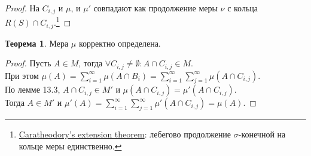 \documentclass[11pt,a4paper]{report}
\theoremstyle{definition}
\theoremstyle{definition}
\newtheorem{theorem}{Теорема}[section]
\theoremstyle{definition}
\begin{document}
	\begin{proof}
		На $ C_{i, j} $ и $ \mu $, и $ \mu' $ совпадают как продолжение меры $ \nu $ с кольца $ R(S) \cap C_{i, j} $.\footnote{\href{https://goo.gl/DLPJQ1}{Caratheodory's extension theorem}: лебегово продолжение $ \sigma $-конечной на кольце меры единственно.}
	\end{proof}
	\begin{theorem}
		Мера $ \mu $ корректно определена.
	\end{theorem}
	\begin{proof}
		Пусть $ A \in M $, тогда $ \forall C_{i, j} \neq \emptyset: A \cap C_{i, j} \in M $.\\ 
		При этом
		$ \mu(A) = \sum\limits_{i=1}^{\infty}{\mu(A \cap B_{i})} = \sum\limits_{i=1}^{\infty}{\sum_{j=1}^{\infty}{\mu(A \cap C_{i, j})}} $.\\
		По лемме 13.3, $ A \cap C_{i, j} \in M' $ и $ \mu(A \cap C_{i, j}) = \mu'(A \cap C_{i, j}) $.\\
		Тогда $ A \in M' $ и $ \mu'(A) =  \sum\limits_{i=1}^{\infty}{\sum\limits_{j=1}^{\infty}{\mu'(A \cap C_{i, j})}} = \mu(A) $.
	\end{proof}
\end{document}
